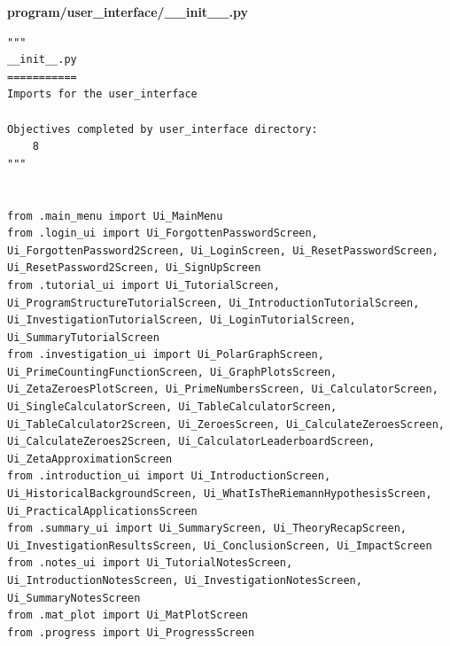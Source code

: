 \documentclass{article}
\begin{document}
\textbf{program/user\_interface/\_\_init\_\_.py}
\begin{lstlisting}
"""
__init__.py
===========
Imports for the user_interface

Objectives completed by user_interface directory:
    8
"""


from .main_menu import Ui_MainMenu
from .login_ui import Ui_ForgottenPasswordScreen, Ui_ForgottenPassword2Screen, Ui_LoginScreen, Ui_ResetPasswordScreen, Ui_ResetPassword2Screen, Ui_SignUpScreen
from .tutorial_ui import Ui_TutorialScreen, Ui_ProgramStructureTutorialScreen, Ui_IntroductionTutorialScreen, Ui_InvestigationTutorialScreen, Ui_LoginTutorialScreen, Ui_SummaryTutorialScreen
from .investigation_ui import Ui_PolarGraphScreen, Ui_PrimeCountingFunctionScreen, Ui_GraphPlotsScreen, Ui_ZetaZeroesPlotScreen, Ui_PrimeNumbersScreen, Ui_CalculatorScreen, Ui_SingleCalculatorScreen, Ui_TableCalculatorScreen, Ui_TableCalculator2Screen, Ui_ZeroesScreen, Ui_CalculateZeroesScreen, Ui_CalculateZeroes2Screen, Ui_CalculatorLeaderboardScreen, Ui_ZetaApproximationScreen
from .introduction_ui import Ui_IntroductionScreen, Ui_HistoricalBackgroundScreen, Ui_WhatIsTheRiemannHypothesisScreen, Ui_PracticalApplicationsScreen
from .summary_ui import Ui_SummaryScreen, Ui_TheoryRecapScreen, Ui_InvestigationResultsScreen, Ui_ConclusionScreen, Ui_ImpactScreen
from .notes_ui import Ui_TutorialNotesScreen, Ui_IntroductionNotesScreen, Ui_InvestigationNotesScreen, Ui_SummaryNotesScreen
from .mat_plot import Ui_MatPlotScreen
from .progress import Ui_ProgressScreen
\end{lstlisting}
\end{document}
